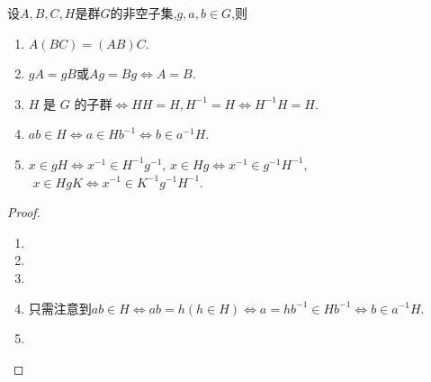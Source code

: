 \documentclass[../../main.tex]{subfiles}%
\begin{document}
\begin{theorem}\label{theorem:子群陪集的基本性质}
设$A,B,C,H$是群$G$的非空子集,$g,a,b\in G$,则
\begin{enumerate}[(1)]
\item\label{theorem:子群陪集的基本性质-1} $A(BC)=(AB)C$.

\item\label{theorem:子群陪集的基本性质-2} $gA=gB\text{或}Ag=Bg\iff A=B$.

\item\label{theorem:子群陪集的基本性质-3} \( H \) 是 \( G \) 的子群$\iff HH = H , H^{-1} = H\iff H^{-1}H = H$.

\item\label{theorem:子群陪集的基本性质-4} $ab\in H\iff a\in Hb^{-1}\iff b\in a^{-1}H$.

\item $x\in gH \iff x^{-1}\in H^{-1}g^{-1}$,$\,\,x\in Hg \iff x^{-1}\in g^{-1}H^{-1}$,$\,\,x\in HgK\iff x^{-1}\in K^{-1}g^{-1}H^{-1}$.
\end{enumerate}
\end{theorem}
\begin{proof}
\begin{enumerate}[(1)]
\item 

\item 

\item 

\item 只需注意到$ab\in H\Longleftrightarrow ab=h\left( h\in H \right) \Longleftrightarrow a=hb^{-1}\in Hb^{-1}\Longleftrightarrow b\in a^{-1}H$.

\item 
\end{enumerate}
\end{proof}
\end{document}
